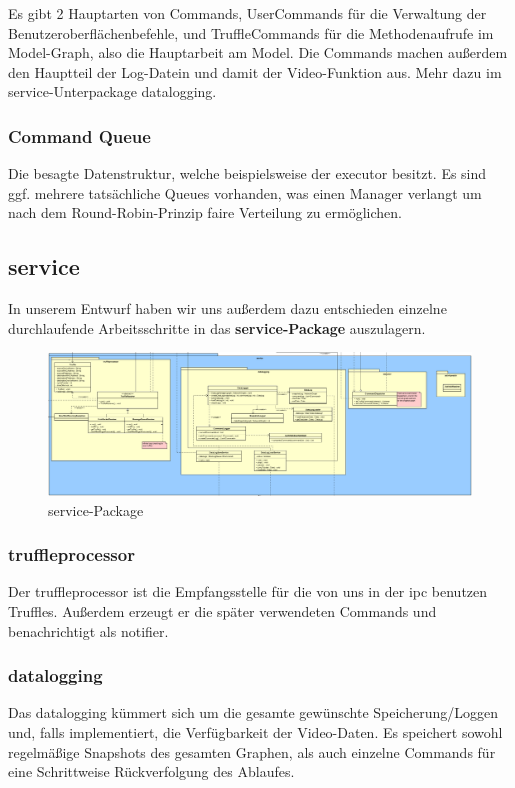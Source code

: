 Es gibt 2 Hauptarten von Commands, UserCommands für die Verwaltung der
Benutzeroberflächenbefehle, und TruffleCommands für die Methodenaufrufe im
Model-Graph, also die Hauptarbeit am Model. Die Commands machen außerdem den
Hauptteil der Log-Datein und damit der Video-Funktion aus. Mehr dazu im
service-Unterpackage datalogging.

    \subsubsection{Command Queue}
    Die besagte Datenstruktur, welche beispielsweise der executor besitzt. Es
    sind ggf. mehrere tatsächliche Queues vorhanden, was einen Manager verlangt
    um nach dem Round-Robin-Prinzip faire Verteilung zu ermöglichen.


\subsection{service}


In unserem Entwurf haben wir uns außerdem dazu entschieden einzelne
durchlaufende Arbeitsschritte in das \textbf{service-Package} auszulagern.\newline

\begin{figure}[H]
  \centering
  \includegraphics[width=\textwidth]{../diagramimages/service.png}
  \caption{service-Package}
  \medskip
\end{figure}

    \subsubsection{truffleprocessor}
    Der truffleprocessor ist die Empfangsstelle für die von uns in der
    \gls{ipc} benutzen Truffles. Außerdem erzeugt er die später verwendeten
    Commands und benachrichtigt als \gls{notifier}.

    \subsubsection{datalogging}
    Das datalogging kümmert sich um die gesamte gewünschte
    Speicherung/Loggen und, falls implementiert, die Verfügbarkeit der
    Video-Daten. Es speichert sowohl regelmäßige Snapshots des gesamten
    Graphen, als auch einzelne Commands für eine Schrittweise Rückverfolgung
    des Ablaufes.

